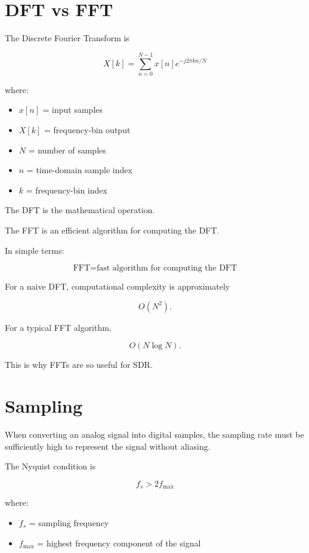 \documentclass[11pt]{article}
\begin{document}
\section{DFT vs FFT}

The Discrete Fourier Transform is

\[
\boxed{
X[k]
=
\sum_{n=0}^{N-1}
x[n]
e^{-j2\pi kn/N}
}
\]

where:

\begin{itemize}
    \item $x[n]$ = input samples
    \item $X[k]$ = frequency-bin output
    \item $N$ = number of samples
    \item $n$ = time-domain sample index
    \item $k$ = frequency-bin index
\end{itemize}

The DFT is the mathematical operation.

The FFT is an efficient algorithm for computing the DFT.

In simple terms:

\[
\boxed{
\text{FFT}
=
\text{fast algorithm for computing the DFT}
}
\]

For a naive DFT, computational complexity is approximately

\[
O(N^2).
\]

For a typical FFT algorithm,

\[
O(N\log N).
\]

This is why FFTs are so useful for SDR.



\section{Sampling}

When converting an analog signal into digital samples, the sampling rate must be sufficiently high to represent the signal without aliasing.

The Nyquist condition is

\[
\boxed{
f_s>2f_{\max}
}
\]

where:

\begin{itemize}
    \item $f_s$ = sampling frequency
    \item $f_{\max}$ = highest frequency component of the signal
\end{itemize}
\end{document}
